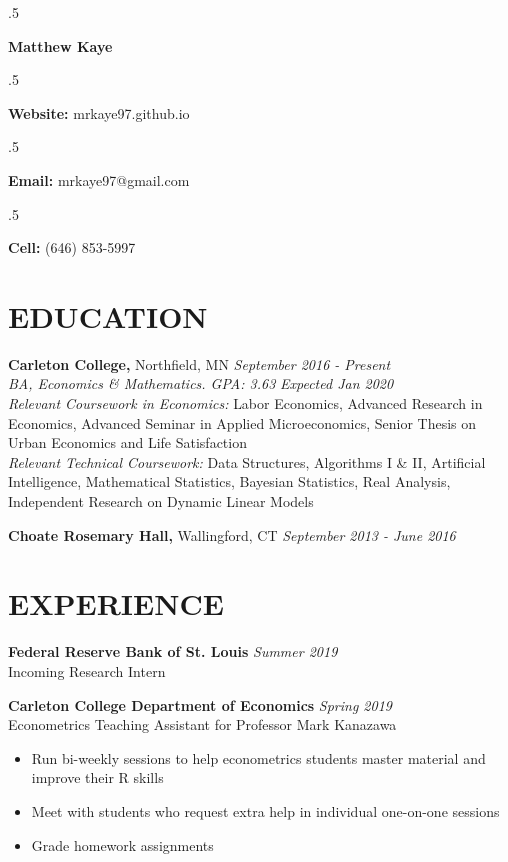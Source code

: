 \documentclass[margin, 9pt]{res} %
\begin{document}
\singlespacing

\moveleft.5\hoffset\centerline{\LARGE\bf Matthew Kaye} %
\medskip
\moveleft.5\hoffset\centerline{\textbf{Website:} mrkaye97.github.io}
\moveleft.5\hoffset\centerline{\textbf{Email:} mrkaye97@gmail.com}
\moveleft.5\hoffset\centerline{\textbf{Cell:} (646) 853-5997}


\begin{resume}


\section{EDUCATION}

{\sl} \textbf{Carleton College,} Northfield, MN \hfill \textit{September 2016 - Present}\smallskip\\
{\sl BA, Economics \& Mathematics. GPA: 3.63} \hfill \textit{Expected Jan 2020}\smallskip\\
{\sl Relevant Coursework in Economics: } Labor Economics, Advanced Research in Economics, Advanced Seminar in Applied Microeconomics, Senior Thesis on Urban Economics and Life Satisfaction\smallskip\\
{\sl Relevant Technical Coursework: } Data Structures, Algorithms I \& II, Artificial Intelligence, Mathematical Statistics, Bayesian Statistics, Real Analysis, Independent Research on Dynamic Linear Models

{\sl} \textbf{Choate Rosemary Hall,} Wallingford, CT \hfill \textit{September 2013 - June 2016}

\section{EXPERIENCE}
{\sl} \textbf{Federal Reserve Bank of St. Louis} \hfill \textit{Summer 2019}\smallskip\\
{\sl} Incoming Research Intern \smallskip

{\sl} \textbf{Carleton College Department of Economics} \hfill \textit{Spring 2019}\\
{\sl} Econometrics Teaching Assistant for Professor Mark Kanazawa\smallskip
{\sl} \begin{itemize}
	\item Run bi-weekly sessions to help econometrics students master material and improve their R skills
	\item Meet with students who request extra help in individual one-on-one sessions
	\item Grade homework assignments
\end{itemize}



\end{resume}
\end{document}
